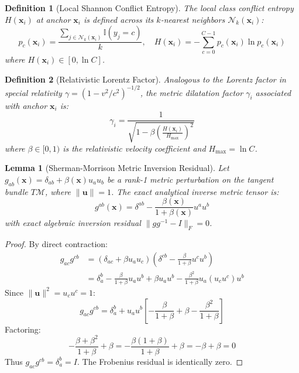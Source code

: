 \documentclass[journal,twoside]{IEEEtran}
\newtheorem{lemma}{Lemma}
\newtheorem{definition}{Definition}
\theoremstyle{remark}
\begin{document}
\begin{definition}[Local Shannon Conflict Entropy]
The local class conflict entropy $H(\mathbf{x}_i)$ at anchor $\mathbf{x}_i$ is defined across its $k$-nearest neighbors $\mathcal{N}_k(\mathbf{x}_i)$:
\begin{equation}
    p_c(\mathbf{x}_i) = \frac{\sum_{j \in \mathcal{N}_k(\mathbf{x}_i)} \mathbb{I}(y_j = c)}{k}, \quad H(\mathbf{x}_i) = -\sum_{c=0}^{C-1} p_c(\mathbf{x}_i) \ln p_c(\mathbf{x}_i)
\end{equation}
where $H(\mathbf{x}_i) \in [0, \ln C]$.
\end{definition}

\begin{definition}[Relativistic Lorentz Factor]
Analogous to the Lorentz factor in special relativity $\gamma = (1 - v^2/c^2)^{-1/2}$, the metric dilatation factor $\gamma_i$ associated with anchor $\mathbf{x}_i$ is:
\begin{equation}
\label{eq:lorentz_gamma}
    \gamma_i = \frac{1}{\sqrt{1 - \beta \left( \frac{H(\mathbf{x}_i)}{H_{\max}} \right)^2}}
\end{equation}
where $\beta \in [0, 1)$ is the relativistic velocity coefficient and $H_{\max} = \ln C$.
\end{definition}

\begin{lemma}[Sherman-Morrison Metric Inversion Residual]
Let $g_{ab}(\mathbf{x}) = \delta_{ab} + \beta(\mathbf{x}) u_a u_b$ be a rank-1 metric perturbation on the tangent bundle $T\mathcal{M}$, where $\|\mathbf{u}\| = 1$. The exact analytical inverse metric tensor is:
\begin{equation}
    g^{ab}(\mathbf{x}) = \delta^{ab} - \frac{\beta(\mathbf{x})}{1 + \beta(\mathbf{x})} u^a u^b
\end{equation}
with exact algebraic inversion residual $\|g g^{-1} - I\|_F = 0$.
\end{lemma}

\begin{proof}
By direct contraction:
\begin{align*}
    g_{ac} g^{cb} &= \left( \delta_{ac} + \beta u_a u_c \right) \left( \delta^{cb} - \frac{\beta}{1 + \beta} u^c u^b \right) \\
    &= \delta_a^b - \frac{\beta}{1 + \beta} u_a u^b + \beta u_a u^b - \frac{\beta^2}{1 + \beta} u_a (u_c u^c) u^b
\end{align*}
Since $\|\mathbf{u}\|^2 = u_c u^c = 1$:
\begin{equation*}
    g_{ac} g^{cb} = \delta_a^b + u_a u^b \left[ -\frac{\beta}{1 + \beta} + \beta - \frac{\beta^2}{1 + \beta} \right]
\end{equation*}
Factoring:
\begin{equation*}
    -\frac{\beta + \beta^2}{1 + \beta} + \beta = -\frac{\beta(1 + \beta)}{1 + \beta} + \beta = -\beta + \beta = 0
\end{equation*}
Thus $g_{ac} g^{cb} = \delta_a^b = I$. The Frobenius residual is identically zero.
\end{proof}
\end{document}
